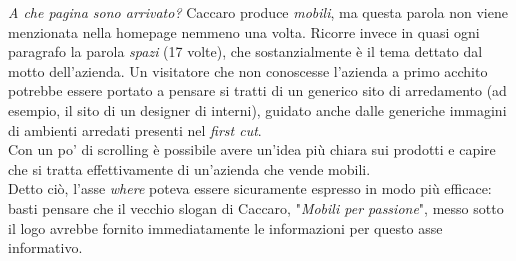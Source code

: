\textit{A che pagina sono arrivato?}\newline
Caccaro produce \textit{mobili}, ma questa parola non viene menzionata nella homepage nemmeno una volta. Ricorre invece in quasi ogni paragrafo la parola \textit{spazi} (17 volte), che sostanzialmente è il tema dettato dal motto dell'azienda. Un visitatore che non conoscesse l'azienda a primo acchito potrebbe essere portato a pensare si tratti di un generico sito di arredamento (ad esempio, il sito di un designer di interni), guidato anche dalle generiche immagini di ambienti arredati presenti nel \textit{first cut}.\\
Con un po' di scrolling è possibile avere un'idea più chiara sui prodotti e capire che si tratta effettivamente di un'azienda che vende mobili. 
\\Detto ciò, l'asse \textit{where} poteva essere sicuramente espresso in modo più efficace: basti pensare che il vecchio slogan di Caccaro, "\textit{Mobili per passione}", messo sotto il logo avrebbe fornito immediatamente le informazioni per questo asse informativo. 
